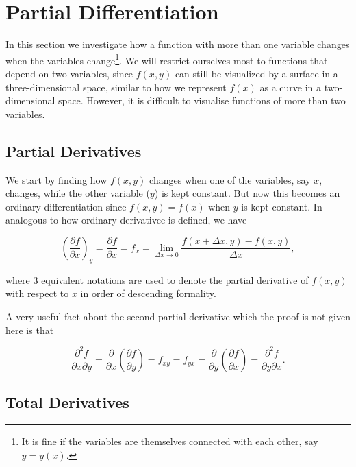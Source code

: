 \documentclass[english,a4paper,12pt]{report}
\begin{document}
\section{Partial Differentiation}

In this section we investigate how a function with more than one variable changes when the variables change\footnote{It is fine if the variables are themselves connected with each other, say\(y = y(x)\).}. We will restrict ourselves most to functions that depend on two variables, since \(f(x,y)\) can still be visualized by a surface in a three-dimensional space, similar to how we represent \(f(x)\) as a curve in a two-dimensional space. However, it is difficult to visualise functions of more than two variables. 

\subsection{Partial Derivatives}

We start by finding how \(f(x,y)\) changes when one of the variables, say \(x\), changes, while the other variable (\(y\)) is kept constant. But now this becomes an ordinary differentiation since \(f(x,y) = f(x)\) when \(y\) is kept constant. In analogous to how ordinary derivativce is defined, we have

\begin{equation}
    \left( \frac{\partial f}{\partial x} \right)_{y} = \frac{\partial f}{\partial x} = f_{x}  = \lim_{\Delta x \to 0} \frac{f(x+\Delta x,y) - f(x,y)}{\Delta x},
\end{equation}

where 3 equivalent notations are used to denote the partial derivative of \(f(x,y)\) with respect to \(x\) in order of descending formality.

A very useful fact about the second partial derivative which the proof is not given here is that 

\begin{equation}
    \frac{\partial^2 f}{\partial x \partial y} = \frac{\partial }{\partial x} \left( \frac{\partial f}{\partial y}  \right) = f_{xy} = f_{yx} = \frac{\partial }{\partial y} \left( \frac{\partial f}{\partial x}  \right) = \frac{\partial^2 f}{\partial y \partial x}.     
\end{equation}

\subsection{Total Derivatives}
\end{document}
